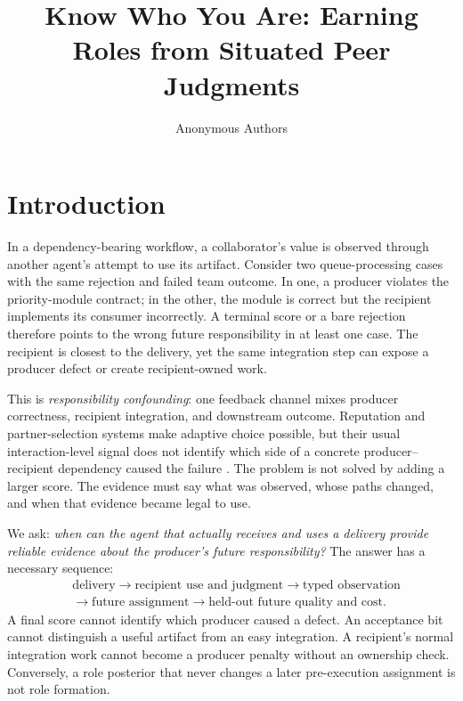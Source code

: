 \documentclass[sigconf,anonymous]{aamas}
\title[Know Who You Are]{Know Who You Are: Earning Roles from Situated Peer Judgments}
\author{Anonymous Authors}
\affiliation{\institution{Internal research draft}}
\begin{document}
\maketitle

\section{Introduction}

In a dependency-bearing workflow, a collaborator's value is observed through another agent's attempt to use its artifact. Consider two queue-processing cases with the same rejection and failed team outcome. In one, a producer violates the priority-module contract; in the other, the module is correct but the recipient implements its consumer incorrectly. A terminal score or a bare rejection therefore points to the wrong future responsibility in at least one case. The recipient is closest to the delivery, yet the same integration step can expose a producer defect or create recipient-owned work.

This is \emph{responsibility confounding}: one feedback channel mixes producer correctness, recipient integration, and downstream outcome. Reputation and partner-selection systems make adaptive choice possible, but their usual interaction-level signal does not identify which side of a concrete producer--recipient dependency caused the failure \cite{sabater2002reputation,pinyol2013trust,leung2025partner,russell2026partner}. The problem is not solved by adding a larger score. The evidence must say what was observed, whose paths changed, and when that evidence became legal to use.

We ask: \emph{when can the agent that actually receives and uses a delivery provide reliable evidence about the producer's future responsibility?} The answer has a necessary sequence:
\begin{equation}
\begin{aligned}
&\text{delivery}\rightarrow\text{recipient use and judgment}\rightarrow\text{typed observation}\\
&\rightarrow\text{future assignment}\rightarrow\text{held-out future quality and cost}.
\end{aligned}
\label{eq:story}
\end{equation}
A final score cannot identify which producer caused a defect. An acceptance bit cannot distinguish a useful artifact from an easy integration. A recipient's normal integration work cannot become a producer penalty without an ownership check. Conversely, a role posterior that never changes a later pre-execution assignment is not role formation.
\end{document}
